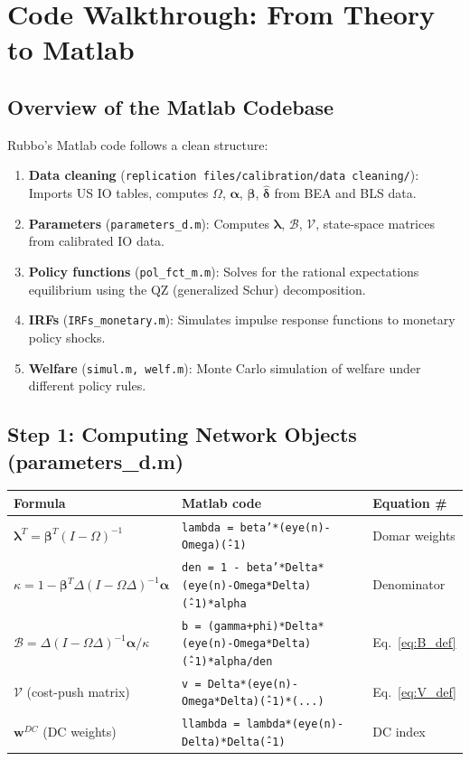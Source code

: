 \documentclass[12pt]{article}
\begin{document}
\section{Code Walkthrough: From Theory to Matlab}

\subsection{Overview of the Matlab Codebase}

Rubbo's Matlab code follows a clean structure:
\begin{enumerate}
    \item \textbf{Data cleaning} (\texttt{replication files/calibration/data cleaning/}): Imports US IO tables, computes $\Omega$, $\bm{\alpha}$, $\bm{\beta}$, $\hat{\bm{\delta}}$ from BEA and BLS data.
    \item \textbf{Parameters} (\texttt{parameters\_d.m}): Computes $\bm{\lambda}$, $\mathcal{B}$, $\mathcal{V}$, state-space matrices from calibrated IO data.
    \item \textbf{Policy functions} (\texttt{pol\_fct\_m.m}): Solves for the rational expectations equilibrium using the QZ (generalized Schur) decomposition.
    \item \textbf{IRFs} (\texttt{IRFs\_monetary.m}): Simulates impulse response functions to monetary policy shocks.
    \item \textbf{Welfare} (\texttt{simul.m, welf.m}): Monte Carlo simulation of welfare under different policy rules.
\end{enumerate}

\subsection{Step 1: Computing Network Objects (parameters\_d.m)}

\begin{center}
\begin{tabular}{lll}
\toprule
\textbf{Formula} & \textbf{Matlab code} & \textbf{Equation \#} \\
\midrule
$\bm{\lambda}^T = \bm{\beta}^T(I-\Omega)^{-1}$ & \texttt{lambda = beta'*(eye(n)-Omega)\^(-1)} & Domar weights \\
$\kappa = 1 - \bm{\beta}^T\Delta(I-\Omega\Delta)^{-1}\bm{\alpha}$ & \texttt{den = 1 - beta'*Delta*(eye(n)-Omega*Delta)\^(-1)*alpha} & Denominator \\
$\mathcal{B} = \Delta(I-\Omega\Delta)^{-1}\bm{\alpha}/\kappa$ & \texttt{b = (gamma+phi)*Delta*(eye(n)-Omega*Delta)\^(-1)*alpha/den} & Eq.~\eqref{eq:B_def} \\
$\mathcal{V}$ (cost-push matrix) & \texttt{v = Delta*(eye(n)-Omega*Delta)\^(-1)*(...)} & Eq.~\eqref{eq:V_def} \\
$\bm{w}^{DC}$ (DC weights) & \texttt{llambda = lambda*(eye(n)-Delta)*Delta\^(-1)} & DC index \\
\bottomrule
\end{tabular}
\end{center}
\end{document}
